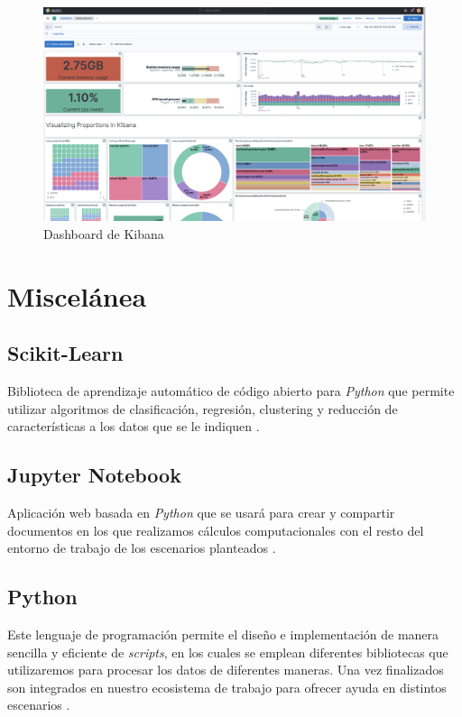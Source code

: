 \begin{figure}
    \centering
    \includegraphics[width=1\linewidth]{img/kibana1.png}
    \caption{Dashboard de Kibana}
    \label{fig:dashboard}
\end{figure}

\section{Miscelánea}

\subsection{Scikit-Learn}
Biblioteca de aprendizaje automático de código abierto para \textit{Python} que permite utilizar algoritmos de clasificación, regresión, clustering y reducción de características a los datos que se le indiquen \cite{scikit}.

\subsection{Jupyter Notebook}
Aplicación web basada en \textit{Python} que se usará para crear y compartir documentos en los que realizamos cálculos computacionales con el resto del entorno de trabajo de los escenarios planteados \cite{jupyter}.

\subsection{Python}
Este lenguaje de programación permite el diseño e implementación de manera sencilla y eficiente de \textit{scripts}, en los cuales se emplean diferentes bibliotecas que utilizaremos para procesar los datos de diferentes maneras. Una vez finalizados son integrados en nuestro ecosistema de trabajo para ofrecer ayuda en distintos escenarios \cite{python}.

